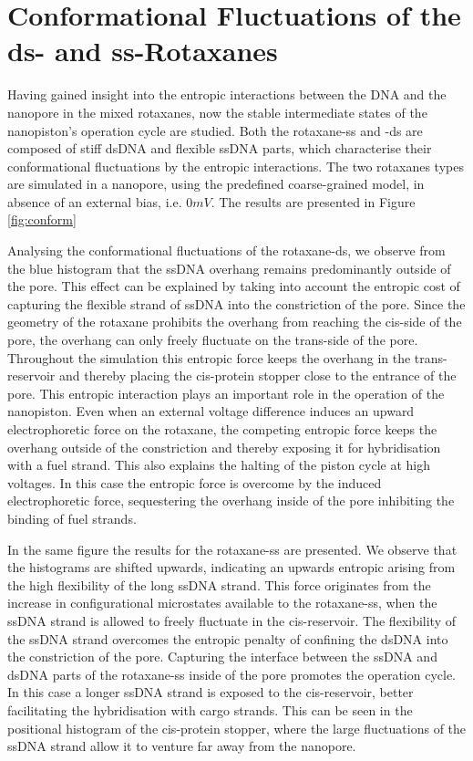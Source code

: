 \section{Conformational Fluctuations of the ds- and ss-Rotaxanes}

Having gained insight into the entropic interactions between the DNA and the
nanopore in the mixed rotaxanes, now the stable intermediate states of the nanopiston's
operation cycle are
studied. Both the rotaxane-ss and -ds are composed of stiff dsDNA and flexible ssDNA
parts, which characterise their conformational fluctuations by the entropic interactions.
The two rotaxanes types are simulated in a nanopore, using the predefined coarse-grained
model, in absence of an external bias, i.e.  $0mV$. The results are presented in Figure
\ref{fig:conform}

Analysing the conformational fluctuations of the rotaxane-ds, we observe from the blue
histogram that the ssDNA
overhang remains predominantly outside of the pore. This effect can be explained by
taking
into account the entropic cost of capturing the flexible strand of ssDNA into the
constriction of the pore. Since the geometry of the rotaxane prohibits the overhang from
reaching the cis-side of the pore, the overhang can only freely fluctuate on the
trans-side of the pore. Throughout the simulation this entropic force keeps the overhang
in the trans-reservoir and thereby placing the cis-protein stopper close to the entrance
of the pore. This entropic interaction plays an important role in the operation of the
nanopiston. Even when an external voltage difference induces an upward electrophoretic
force on the rotaxane, the competing entropic force keeps the overhang outside of the
constriction and thereby exposing it for hybridisation with a fuel strand. This also
explains the halting of the piston cycle at high voltages. In this case the entropic
force is overcome by the induced electrophoretic force, sequestering the overhang inside
of the pore inhibiting the binding of fuel strands.

In the same figure the results for the rotaxane-ss are presented. We observe that the
histograms are shifted upwards, indicating an upwards entropic arising from the high
flexibility of the long ssDNA strand. This force originates from the increase in
configurational microstates available to the rotaxane-ss, when the ssDNA strand is
allowed to freely fluctuate in the
cis-reservoir. The flexibility of the ssDNA strand overcomes the entropic penalty of
confining the dsDNA into the constriction of the pore. Capturing the interface between
the ssDNA and dsDNA parts of the rotaxane-ss inside of the pore promotes the
operation cycle. In this case a longer ssDNA strand is exposed to the cis-reservoir,
better facilitating the hybridisation with cargo strands. This can be seen in the
positional histogram of the cis-protein stopper, where the large fluctuations of the
ssDNA strand allow it to venture far away from the nanopore.

